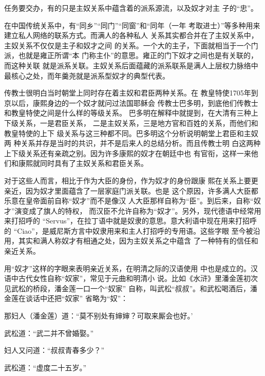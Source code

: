 任务要交办，有的只是主奴关系中蕴含着的派系源流，以及奴才对主%
子的“忠”。%
\par
在中国传统关系中，有“同乡”“同门”“同窗”和“同年（一年%
考取进士）”等多种用来建立私人网络的联系方式。而满人的各种私人%
关系其实都合并在了主奴关系中，主奴关系不仅仅是主子和奴才之间%
的关系。一个大的主子，下面就相当于一个门派，也就是雍正所谓“本%
门称主仆”的意思。雍正的门下奴才之间也是有关联的，而这种关联%
就是派系关联。主奴关系后面蕴藏的派系联系是满人上层权力脉络中%
最核心之处，而年羹尧就是派系型奴才的典型代表。%
\par
传教士很明白当时朝堂上同时存在着主奴和君臣两种关系。在%
教皇特使1705年到京以后，康熙身边的一个奴才就问过法国耶稣会%
传教士巴多明，到底他们传教士和教皇特使之间是什么样的等级关系。%
巴多明在解释中就提到，在大清有三种上下级关系，一是君臣关系，%
二是主奴关系，三是地方官和百姓的关系，而他们和教皇特使的上下%
级关系与这三种都不同。巴多明这个分析说明朝堂上君臣和主奴两%
种关系并存是当时的共识，并不是后来人的总结分析。而且传教士明%
白这两种上下级关系还有亲疏之别。因为许多康熙的奴才在朝廷中也%
有官衔，这样一来他们和康熙就同时具有了主奴关系和君臣关系。%
\par
对于这些人而言，相比于作为大臣的身份，作为奴才的身份跟康%
熙在关系上要更亲近，因为奴才里面蕴含了一层家庭门派关联。也是%
这个原因，许多满人大臣都乐意在皇帝面前自称“奴才”而不是像汉%
人大臣那样自称为“臣”。到后来，自称“奴才”演变成了旗人的特权，%
而汉臣不允许自称为“奴才”。另外，现代德语中经常用来打招呼的%
“Servus”，在拉丁语中就是奴隶的意思。意大利语中现在用来打招呼的%
“Ciao”，是威尼斯方言中奴隶用来和主人打招呼的专用语。这些字眼%
至今被沿用，其实和满人称奴才有相通之处，因为主奴关系之中蕴含%
了一种特有的信任和亲近关系。%
\par
用“奴才”这样的字眼来表明亲近关系，在明清之际的汉语使用%
中也是成立的。汉语中古代女性自称“奴家”，常见于元曲和明清小%
说。比如《水浒》里潘金莲初次见武松的桥段，潘金莲一口一个“奴家”%
自称，叫武松“叔叔”。和武松喝酒后，潘金莲在谈话中还把“奴家”%
省略为“奴”：%
\par
{\bookkai 那妇人（潘金莲）道：“莫不别处有婶婶？可取来厮会也好。’}%
\par
{\bookkai 武松道：“武二并不曾婚娶。”}%
\par
{\bookkai 妇人又问道：“叔叔青春多少？”}%
\par
{\bookkai 武松道：“虚度二十五岁。”}%
\par
